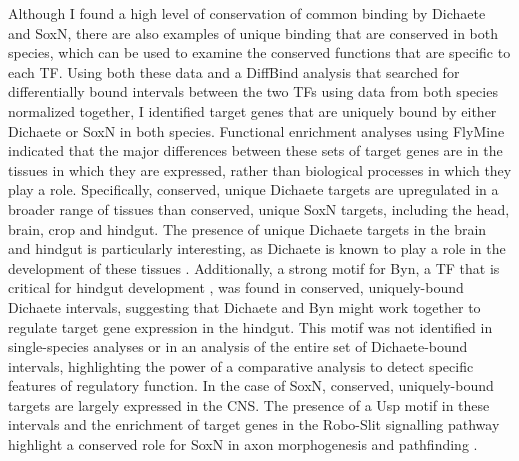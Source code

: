 Although I found a high level of conservation of common binding by Dichaete and SoxN, there are also examples of unique binding that are conserved in both species, which can be used to examine the conserved functions that are specific to each TF. Using both these data and a DiffBind analysis that searched for differentially bound intervals between the two TFs using data from both species normalized together, I identified target genes that are uniquely bound by either Dichaete or SoxN in both species. Functional enrichment analyses using FlyMine indicated that the major differences between these sets of target genes are in the tissues in which they are expressed, rather than biological processes in which they play a role. Specifically, conserved, unique Dichaete targets are upregulated in a broader range of tissues than conserved, unique SoxN targets, including the head, brain, crop and hindgut. The presence of unique Dichaete targets in the brain and hindgut is particularly interesting, as Dichaete is known to play a role in the development of these tissues \citep{sanchez-soriano_regulatory_2000}. Additionally, a strong motif for Byn, a TF that is critical for hindgut development \citep{kispert_homologs_1994,murakami_developmental_1999}, was found in conserved, uniquely-bound Dichaete intervals, suggesting that Dichaete and Byn might work together to regulate target gene expression in the hindgut. This motif was not identified in single-species analyses or in an analysis of the entire set of Dichaete-bound intervals, highlighting the power of a comparative analysis to detect specific features of regulatory function. In the case of SoxN, conserved, uniquely-bound targets are largely expressed in the CNS. The presence of a Usp motif in these intervals and the enrichment of target genes in the Robo-Slit signalling pathway highlight a conserved role for SoxN in axon morphogenesis and pathfinding \citep{ferrero_soxneuro_2014,girard_chromatin_2006,lee_cell-autonomous_????,parrish_genome-wide_2006}.\\


